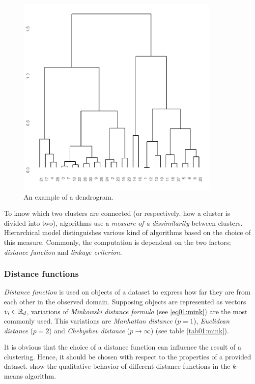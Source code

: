 \begin{figure}\centering
	\includegraphics[width=10cm]{img/dendro}
	\caption{An example of a dendrogram.}
	\label{fig01:dendro}
\end{figure}

To know which two clusters are connected (or respectively, how a cluster is divided into two), algorithms use a \emph{measure of a dissimilarity} between clusters.  
Hierarchical model distinguishes various kind of algorithms based on the choice of this measure. Commonly, the computation is dependent on the two factors; \emph{distance function} and \emph{linkage criterion}. 

\subsubsection{Distance functions}

\emph{Distance function} is used on objects of a dataset to express how far they are from each other in the observed domain. Supposing objects are represented as vectors $v_i \in \mathbb{R}_d$, variations of \emph{Minkowski distance formula} (see \ref{eq01:mink}) are the most commonly used.
This variations are \emph{Manhattan distance} ($p=1$), \emph{Euclidean distance} ($p=2$) and \emph{Chebyshev distance} ($p \to \infty$) (see table \ref{tab01:mink}).

It is obvious that the choice of a distance function can influence the result of a clustering. Hence, it should be chosen with respect to the properties of a provided dataset. \citet{aggarwal2001surprising} show the qualitative behavior of different distance functions in the $k$-means algorithm.  

